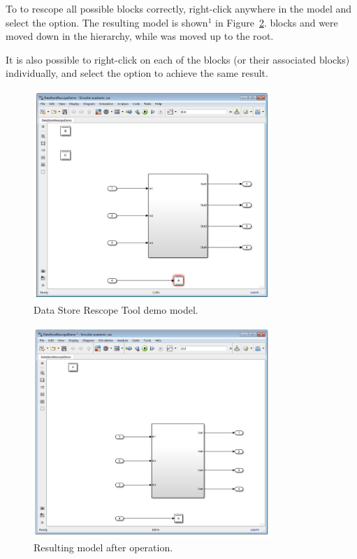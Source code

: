 \documentclass{article}
\makeatletter
\newcommand{\ToolName}{Data Store Rescope Tool\@\xspace}
\newcommand{\menu}[2]{%
	\ifthenelse{\equal{#1}{1}}{Rescope All}{}%
  	\ifthenelse{\equal{#1}{2}}{Rescope Selected}{}%
  	\ifthenelse{\equal{#1}{3}}{Rescope Non-Selected}{}%
}
\makeatother
\begin{document}
To to rescope all possible \DSM blocks correctly, right-click anywhere in the model and select the  option. The resulting model is shown$^1$ in Figure~\ref{FIG:demo2}. \DSM blocks  and  were moved down in the hierarchy, while  was moved up to the root.

It is also possible to right-click on each of the \DSM blocks (or their associated \DSRW blocks) individually, and select the  option to achieve the same result.

\begin{figure}
	\centering
	\includegraphics[width=0.8\textwidth]{../figs/Demo1}
	\caption{\ToolName demo model.}
	\label{FIG:demo1}
\end{figure}

\begin{figure}
	\centering
	\includegraphics[width=0.8\textwidth]{../figs/Demo2}
	\caption{Resulting model after  operation.}
	\label{FIG:demo2}
\end{figure}
\end{document}

